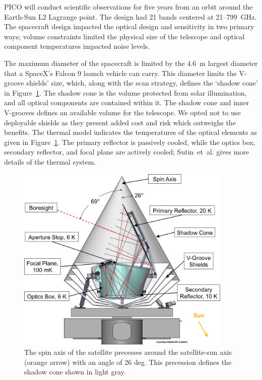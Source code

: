 \documentclass[]{spie}  %
\begin{document}
PICO will conduct scientific observations for five years from an orbit around the Earth-Sun L2 Lagrange point. The design had
21 bands centered at 21--799~GHz.  The spacecraft design impacted 
the optical design and sensitivity in two primary ways; volume constraints limited the physical size of the telescope and optical component 
temperatures impacted noise levels.  

The maximum diameter of the spacecraft is limited by the 4.6~m largest diameter that a SpaceX's Falcon 9 launch vehicle can 
carry.  This diameter limits the V-groove shields' size, which, along with the scan strategy, defines the `shadow cone' in Figure~\ref{fig:cad}.  
The shadow cone is the volume protected from solar illumination, and all optical components are contained within it. The shadow cone and 
inner V-grooves defines an available volume for the telescope.  We opted not to use deployable shields as they present added cost 
and risk which outweighs the benefits. The thermal model indicates the temperatures of the optical elements as given in Figure~\ref{fig:cad}. 
The primary reflector is passively cooled, while the optics box, secondary reflector, and focal plane are actively cooled; Sutin~et~al.\cite{brian_spie}
gives more details of the thermal system. 

\begin{figure} [ht]
\begin{center}
\includegraphics[height=9cm]{PICO_CAD_annotated.png}
\end{center}
\caption { \label{fig:cad} 
The spin axis of the satellite precesses around the satellite-sun axis (orange arrow) with an angle of 26 deg.
This precession defines the shadow cone shown in light gray.
}
\end{figure} 
\end{document}
